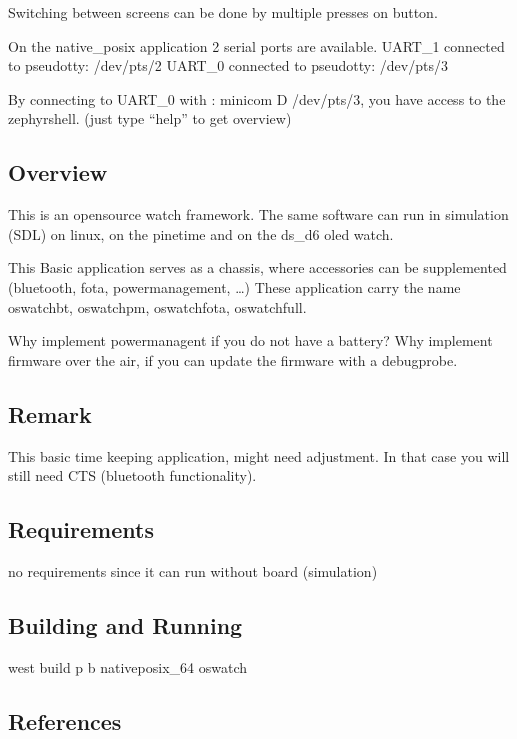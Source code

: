 \documentclass[letterpaper,10pt,english]{sphinxmanual}
\begin{document}
Switching between screens can be done by multiple presses on button.

On the native\_posix application 2 serial ports are available.
UART\_1 connected to pseudotty: /dev/pts/2
UART\_0 connected to pseudotty: /dev/pts/3

By connecting to UART\_0 with :  minicom \sphinxhyphen{}D /dev/pts/3, you have access to the zephyr\sphinxhyphen{}shell.
(just type “help” to get overview)


\subsection{Overview}
\label{\detokenize{samples/oswatchREADME:overview}}
This is an opensource watch framework.
The same software can run in simulation (SDL) on linux, on the pinetime and on the ds\_d6 oled watch.

This Basic application serves as a chassis, where accessories can be supplemented (bluetooth, fota, powermanagement, …)
These application carry the name oswatch\sphinxhyphen{}bt, oswatch\sphinxhyphen{}pm, oswatch\sphinxhyphen{}fota, oswatch\sphinxhyphen{}full.

Why implement powermanagent if you do not have a battery?
Why implement firmware over the air, if you can update the firmware with a debugprobe.


\subsection{Remark}
\label{\detokenize{samples/oswatchREADME:remark}}
This basic time keeping application, might need adjustment.
In that case you will still need CTS (bluetooth functionality).


\subsection{Requirements}
\label{\detokenize{samples/oswatchREADME:requirements}}
no requirements since it can run without board (simulation)


\subsection{Building and Running}
\label{\detokenize{samples/oswatchREADME:building-and-running}}
west build \sphinxhyphen{}p \sphinxhyphen{}b  native\sphinxhyphen{}posix\_64 oswatch


\subsection{References}
\label{\detokenize{samples/oswatchREADME:references}}
\end{document}
